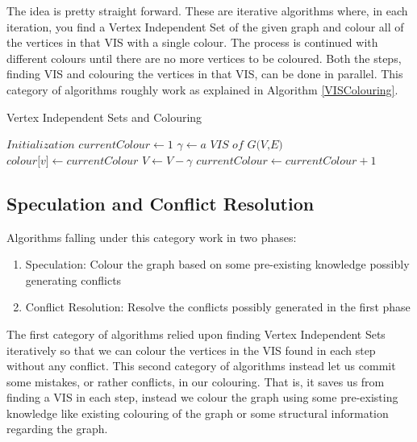 \documentclass[MTech]{iitmdiss}
\begin{document}
The idea is pretty straight forward. These are iterative algorithms where, in each iteration, you find a Vertex Independent Set of the given graph and colour all of the vertices in that VIS with a single colour. The process is continued with different colours until there are no more vertices to be coloured. Both the steps, finding VIS and colouring the vertices in that VIS, can be done in parallel. This category of algorithms roughly work as explained in Algorithm \ref{VISColouring}.

\begin{algorithm}
\caption{Vertex Independent Sets and Colouring}\label{VISColouring}
\begin{algorithmic}[1]
\State $\textit{Initialization}$
\State $\textit{currentColour} \gets 1$
 
\State $\gamma \gets \textit{a VIS of G(V,E)}$ 
 
\State $\textit{colour[v]} \gets currentColour$
\EndFor
\State $V \gets V-\gamma$
\State $\textit{currentColour} \gets \textit{currentColour}+1$
\EndWhile
\EndProcedure
\end{algorithmic}
\end{algorithm}

\subsection{Speculation and Conflict Resolution}
Algorithms falling under this category work in two phases:
\begin{enumerate}
\item Speculation: Colour the graph based on some pre-existing knowledge possibly generating conflicts
\item Conflict Resolution: Resolve the conflicts possibly generated in the first phase
\end{enumerate}
The first category of algorithms relied upon finding Vertex Independent Sets iteratively so that we can colour the vertices in the VIS found in each step without any conflict. This second category of algorithms instead let us commit some mistakes, or rather conflicts, in our colouring. That is, it saves us from finding a VIS in each step, instead we colour the graph using some pre-existing knowledge like existing colouring of the graph or some structural information regarding the graph.
\end{document}
